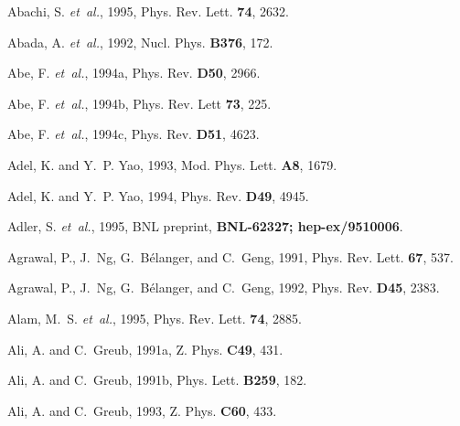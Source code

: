 \begin{thebibliography}{\protect{}1991}

Abachi, S. {\em et~al.\/}, 1995,
\newblock Phys. Rev. Lett. {\bf 74}, 2632.

Abada, A. {\em et~al.\/}, 1992,
\newblock Nucl. Phys. {\bf B376}, 172.

Abe, F. {\em et~al.\/}, 1994a,
\newblock Phys. Rev. {\bf D50}, 2966.

Abe, F. {\em et~al.\/}, 1994b,
\newblock Phys. Rev. Lett {\bf 73}, 225.

Abe, F. {\em et~al.\/}, 1994c,
\newblock Phys. Rev. {\bf D51}, 4623.

Adel, K. and Y.~P. Yao, 1993,
\newblock Mod. Phys. Lett. {\bf A8}, 1679.

Adel, K. and Y.~P. Yao, 1994,
\newblock Phys. Rev. {\bf D49}, 4945.

Adler, S. {\em et~al.\/}, 1995,
\newblock BNL preprint, {\bf BNL-62327; hep-ex/9510006}.

Agrawal, P., J.~Ng, G.~B{\'e}langer, and C.~Geng, 1991,
\newblock Phys. Rev. Lett. {\bf 67}, 537.

Agrawal, P., J.~Ng, G.~B{\'e}langer, and C.~Geng, 1992,
\newblock Phys. Rev. {\bf D45}, 2383.

Alam, M.~S. {\em et~al.\/}, 1995,
\newblock Phys. Rev. Lett. {\bf 74}, 2885.

Ali, A. and C.~Greub, 1991a,
\newblock Z. Phys. {\bf C49}, 431.

Ali, A. and C.~Greub, 1991b,
\newblock Phys. Lett. {\bf B259}, 182.

Ali, A. and C.~Greub, 1993,
\newblock Z. Phys. {\bf C60}, 433.


\end{thebibliography}
